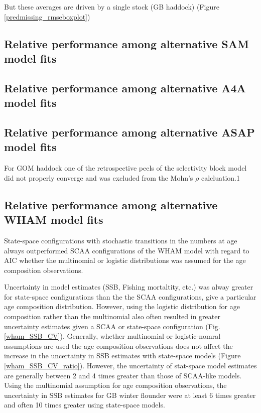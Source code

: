 \documentclass[12pt,letterpaper, leqno]{article}
\begin{document}
But these averages are driven by a single stock (GB haddock) (Figure \ref{predmissing_rmseboxplot})

\subsection*{Relative performance among alternative SAM model fits}

\subsection*{Relative performance among alternative A4A model fits}

\subsection*{Relative performance among alternative ASAP model fits}

For GOM haddock one of the retrospective peels of the selectivity block model did not properly converge and was excluded from the Mohn's $\rho$ calcluation.1

\subsection*{Relative performance among alternative WHAM model fits}

State-space configurations with stochastic transitions in the numbers at age always outperformed SCAA configurations of the WHAM model with regard to AIC whether the multinomial or logistic distributions was assumed for the age composition observations. 

Uncertainty in model estimates (SSB, Fishing mortaltity, etc.) was alway greater for state-space configurations than the the SCAA configurations, give a particular age composition distribution. However, using the logistic distribution for age composition rather than the multinomial also often resulted in greater uncertainty estimates given a SCAA or state-space configuration (Fig. \ref{wham_SSB_CV}). Generally, whether multinomial or logistic-nomral assumptions are used the age composition observations does not affect the increase in the uncertainty in SSB estimates with state-space models  (Figure \ref{wham_SSB_CV_ratio}). However, the uncertainty of stat-space model estimates are generally between 2 and 4 times greater than those of SCAA-like models. Using the multinomial assumption for age composition observations, the uncertainty in SSB estimates for GB winter flounder were at least 6 times greater and often 10 times greater using state-space models.
\end{document}
